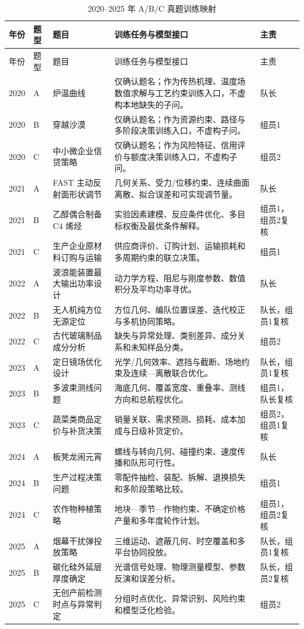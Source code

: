 \documentclass[UTF8,a4paper,12pt]{ctexart}
\begin{document}
\begin{longtable}{p{1.2cm}p{1.3cm}p{3.3cm}p{6.0cm}p{1.9cm}}
\caption{2020--2025 年 A/B/C 真题训练映射}\label{tab:problems}\\
\toprule
年份 & 题型 & 题目 & 训练任务与模型接口 & 主责\\
\midrule
\endfirsthead
\toprule
年份 & 题型 & 题目 & 训练任务与模型接口 & 主责\\
\midrule
\endhead
2020 & A & 炉温曲线 & 仅确认题名；作为传热机理、温度场数值求解与工艺约束训练入口，不虚构本地缺失的子问。 & 队长\\
2020 & B & 穿越沙漠 & 仅确认题名；作为资源约束、路径与多阶段决策训练入口，不虚构子问。 & 组员1\\
2020 & C & 中小微企业信贷策略 & 仅确认题名；作为风险特征、信用评价与额度决策训练入口，不虚构子问。 & 组员2\\
2021 & A & FAST 主动反射面形状调节 & 几何关系、受力/位移约束、连续曲面离散、拟合误差和可实现调节量。 & 队长\\
2021 & B & 乙醇偶合制备 C4 烯烃 & 实验因素建模、反应条件优化、多目标权衡及最优条件解释。 & 组员1，组员2复核\\
2021 & C & 生产企业原材料订购与运输 & 供应商评价、订购计划、运输损耗和多周期约束的联立决策。 & 组员1\\
2022 & A & 波浪能装置最大输出功率设计 & 动力学方程、阻尼与刚度参数、数值积分及平均功率寻优。 & 队长\\
2022 & B & 无人机纯方位无源定位 & 方位几何、编队位置误差、迭代校正与多机协同策略。 & 队长，组员1复核\\
2022 & C & 古代玻璃制品成分分析 & 缺失与异常处理、类别差异、成分关系和未知样品分类。 & 组员2\\
2023 & A & 定日镜场优化设计 & 光学/几何效率、遮挡与截断、场地约束及连续—离散联合优化。 & 队长，组员1复核\\
2023 & B & 多波束测线问题 & 海底几何、覆盖宽度、重叠率、测线方向和总航程优化。 & 组员1，队长复核\\
2023 & C & 蔬菜类商品定价与补货决策 & 销量关联、需求预测、损耗、成本加成与日级补货定价。 & 组员2，组员1复核\\
2024 & A & 板凳龙闹元宵 & 螺线与转向几何、碰撞约束、速度传播和队形可行性。 & 队长\\
2024 & B & 生产过程决策问题 & 零配件抽检、装配、拆解、退换损失和多阶段策略比较。 & 组员1\\
2024 & C & 农作物种植策略 & 地块—季节—作物约束、不确定价格产量和多年度轮作计划。 & 组员1，组员2复核\\
2025 & A & 烟幕干扰弹投放策略 & 三维运动、遮蔽几何、时空覆盖和多平台协同投放。 & 队长，组员1复核\\
2025 & B & 碳化硅外延层厚度确定 & 光谱信号处理、物理测量模型、参数反演和误差分析。 & 队长，组员2复核\\
2025 & C & 无创产前检测时点与异常判定 & 分组时点优化、异常识别、风险约束和模型泛化检验。 & 组员2\\
\bottomrule
\end{longtable}
\end{document}
